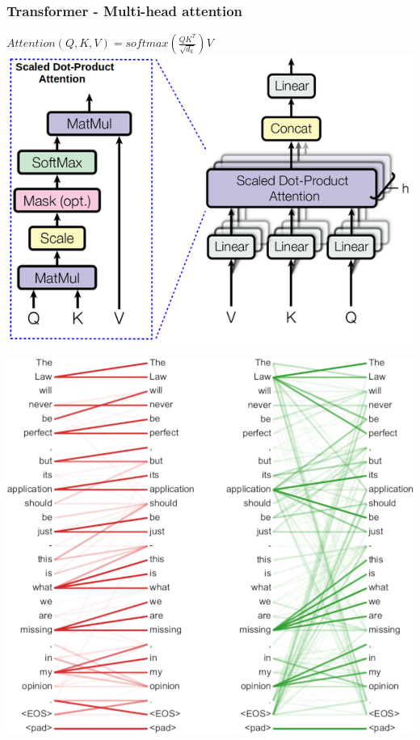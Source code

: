 \documentclass{beamer}
\begin{document}
\begin{frame}
    \frametitle{Transformer - Multi-head attention}
    \begin{center}
        \item $ Attention (Q, K, V) = softmax(\frac{QK^T}{\sqrt{d_k}})V $
        \includegraphics[scale=0.45]{img/multi_head_attention.png}
    \end{center}
\end{frame}

\begin{frame}
    \begin{center}
        \includegraphics[scale=1.2]{img/transformer_att_sentence.png}
    \end{center}
\end{frame}
\end{document}
